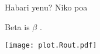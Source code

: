 \documentclass[12pt]{article}
\begin{document}
Habari yenu?
Niko poa

Beta is $\beta$ \cite{LawaLouw18}.

\texttt{[image: plot.Rout.pdf]}

\printbibliography
\end{document}
